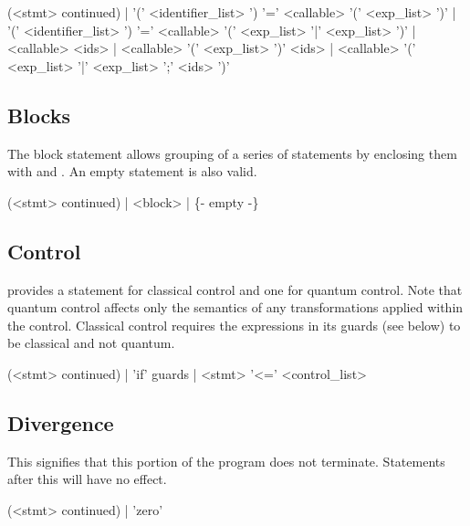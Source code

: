 \begin{singlespace}
\begin{bnf}   
   (<stmt> continued)  
        | '(' <identifier_list> ') '=' 
	      <callable>  '(' <exp_list> ')'
        | '(' <identifier_list> ') '='
	      <callable>  '(' <exp_list> '|' <exp_list> ')'
        | <callable> <ids>
        | <callable> '(' <exp_list> ')' <ids>
        | <callable> '(' <exp_list> '|' <exp_list> ';' 
	      <ids> ')'
\end{bnf}
\end{singlespace}

\subsection{Blocks} 
The block statement allows grouping of a 
series of statements by enclosing them with \inlqpl{\{} and \inlqpl{\}}.
An empty statement is also valid.

\begin{singlespace}
\begin{bnf}   
   (<stmt> continued)  
        |  <block>  
	| \{- empty -\}  
\end{bnf}
\end{singlespace}

\subsection{Control} 
\lqpl{} provides a statement for classical control and
one for quantum control. Note that quantum control affects only the semantics
of any transformations applied within the control. Classical control requires
the expressions in its guards (see below) to be classical and not quantum.

\begin{singlespace}
\begin{bnf}   
   (<stmt> continued)  
        | 'if' guards
	| <stmt> '<=' <control_list>
\end{bnf}
\end{singlespace}

\subsection{Divergence}
 This signifies that this portion of the program does not
terminate. Statements after this will have no effect. 
\begin{singlespace}
\begin{bnf}   
   (<stmt> continued)  
        | 'zero'                       
\end{bnf}
\end{singlespace}

